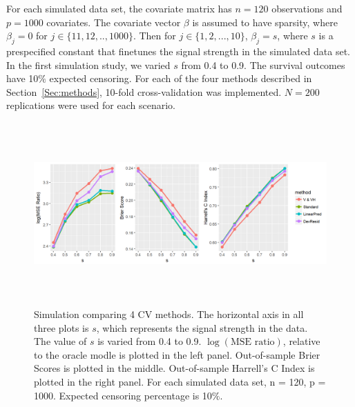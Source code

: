  For each simulated data set, the covariate matrix has $n = 120$ observations and $p = 1000$ covariates. The covariate vector $\beta$ is assumed to have sparsity, where $\beta_j = 0$ for $j \in \{11,12,..,1000\}$. Then for $j \in \{1,2, ..., 10 \}$, $\beta_j = s$, where $s$ is a prespecified constant that finetunes the signal strength in the simulated data set. In the first simulation study, we varied $s$ from 0.4 to 0.9. The survival outcomes have 10$\%$ expected censoring. For each of the four methods described in Section~\ref{Sec:methods}, 10-fold cross-validation was implemented. $N = 200$ replications were used for each scenario.

\begin{figure}[ht]
  \centering
  \includegraphics[height= 7cm ]{./manuscript_figure/figure_2_new.png}
  \caption{\label{Fig:mse-brier-c} Simulation comparing 4 CV methods. The horizontal axis in all three plots is $s$, which represents the signal strength in the data. The value of $s$ is varied from 0.4 to 0.9.  $\log(\text{MSE ratio})$, relative to the oracle modle is plotted in the left panel. Out-of-sample Brier Scores is plotted in the middle. Out-of-sample Harrell's C Index is plotted in the right panel. For each simulated data set, n = 120, p = 1000. Expected censoring percentage is 10$\%$. } 
\end{figure}	


